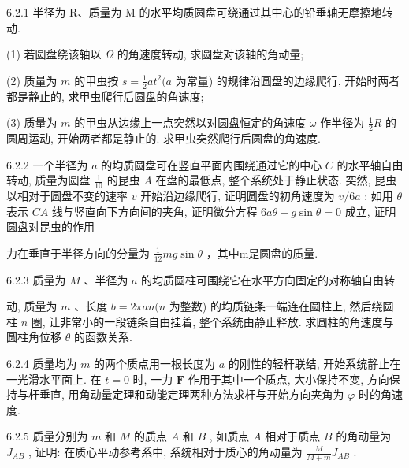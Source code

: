 \begin{problem}{6.2.1}
半径为 R、质量为 M 的水平均质圆盘可绕通过其中心的铅垂轴无摩擦地转动.

(1) 若圆盘绕该轴以 $\Omega$ 的角速度转动, 求圆盘对该轴的角动量;

(2) 质量为 $m$ 的甲虫按 $s = \frac{1}{2} at^2 (a$ 为常量) 的规律沿圆盘的边缘爬行, 开始时两者都是静止的, 求甲虫爬行后圆盘的角速度;

(3) 质量为 $m$ 的甲虫从边缘上一点突然以对圆盘恒定的角速度 $\omega$ 作半径为 $\frac{1}{2} R$ 的圆周运动, 开始两者都是静止的. 求甲虫突然爬行后圆盘的角速度.
\end{problem}
\clearpage


\begin{problem}{6.2.2}
一个半径为 $a$ 的均质圆盘可在竖直平面内围绕通过它的中心 $C$ 的水平轴自由转动, 质量为圆盘 $\frac{1}{10}$ 的昆虫 $A$ 在盘的最低点, 整个系统处于静止状态. 突然, 昆虫以相对于圆盘不变的速率 $v$ 开始沿边缘爬行, 证明圆盘的初角速度为 $v / 6a$ ; 如用 $\theta$ 表示 $CA$ 线与竖直向下方向间的夹角, 证明微分方程 $6a \ddot{\theta} + g \sin \theta = 0$ 成立, 证明圆盘对昆虫的作用

力在垂直于半径方向的分量为 $\frac{1}{12}mg\sin\theta$ ，其中m是圆盘的质量.
\begin{center}

\end{center}
\end{problem}
\clearpage


\begin{problem}{6.2.3}
质量为 $M$ 、半径为 $a$ 的均质圆柱可围绕它在水平方向固定的对称轴自由转

动, 质量为 $m$ 、长度 $b = 2\pi an (n$ 为整数) 的均质链条一端连在圆柱上, 然后绕圆柱 $n$ 圈, 让非常小的一段链条自由挂着, 整个系统由静止释放. 求圆柱的角速度与圆柱角位移 $\theta$ 的函数关系.
\end{problem}
\clearpage


\begin{problem}{6.2.4}
质量均为 $m$ 的两个质点用一根长度为 $a$ 的刚性的轻杆联结, 开始系统静止在一光滑水平面上. 在 $t = 0$ 时, 一力 $\bm{F}$ 作用于其中一个质点, 大小保持不变, 方向保持与杆垂直, 用角动量定理和动能定理两种方法求杆与开始方向夹角为 $\varphi$ 时的角速度.
\end{problem}
\clearpage


\begin{problem}{6.2.5}
质量分别为 $m$ 和 $M$ 的质点 $A$ 和 $B$ , 如质点 $A$ 相对于质点 $B$ 的角动量为 $J_{AB}$ , 证明: 在质心平动参考系中, 系统相对于质心的角动量为 $\frac{M}{M + m} J_{AB}$ .
\end{problem}
\clearpage


